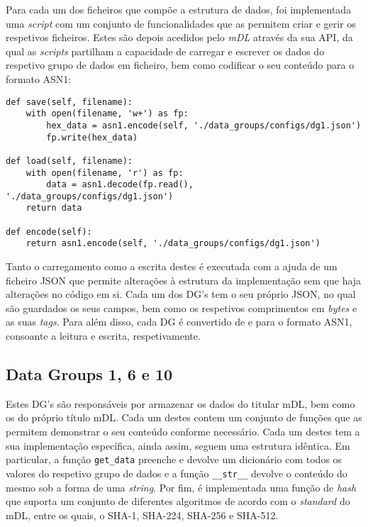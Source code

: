 
Para cada um dos ficheiros que compõe a estrutura de dados, foi implementada uma \textit{script} com um conjunto de funcionalidades que as permitem criar e gerir os respetivos ficheiros. Estes são depois acedidos pelo \textit{mDL} através da sua API, da qual as \textit{scripts} partilham a capacidade de carregar e escrever os dados do respetivo grupo de dados em ficheiro, bem como codificar o seu conteúdo	para o formato ASN1:

\begin{Verbatim}[frame=single, framerule=0.5mm]
def save(self, filename):
    with open(filename, 'w+') as fp:
        hex_data = asn1.encode(self, './data_groups/configs/dg1.json')
        fp.write(hex_data)

def load(self, filename):
    with open(filename, 'r') as fp:
        data = asn1.decode(fp.read(), './data_groups/configs/dg1.json')
    return data

def encode(self):
    return asn1.encode(self, './data_groups/configs/dg1.json')
\end{Verbatim}

Tanto o carregamento como a escrita destes é executada com a ajuda de um ficheiro JSON que permite alterações à estrutura da implementação sem que haja alterações no código em si. Cada um dos DG's tem o seu próprio JSON, no qual são guardados os seus campos, bem como os respetivos comprimentos em \textit{bytes} e as suas \textit{tags}. Para além disso, cada DG é convertido de e para o formato ASN1, consoante a leitura e escrita, respetivamente.

\subsection{Data Groups 1, 6 e 10}

Estes DG's são responsáveis por armazenar os dados do titular mDL, bem como os do próprio título mDL. Cada um destes contem um conjunto de funções que as permitem demonstrar o seu conteúdo conforme necessário. Cada um destes tem a sua implementação específica, ainda assim, seguem uma estrutura idêntica. Em particular, a função \texttt{get\_data} preenche e devolve um dicionário com todos os valores do respetivo grupo de dados e a função \texttt{\_\_str\_\_} devolve o conteúdo do mesmo sob a forma de uma \textit{string}. Por fim, é implementada uma função de \textit{hash} que suporta um conjunto de diferentes algoritmos de acordo com o \textit{standard} do mDL, entre os quais, o SHA-1, SHA-224, SHA-256 e SHA-512.


